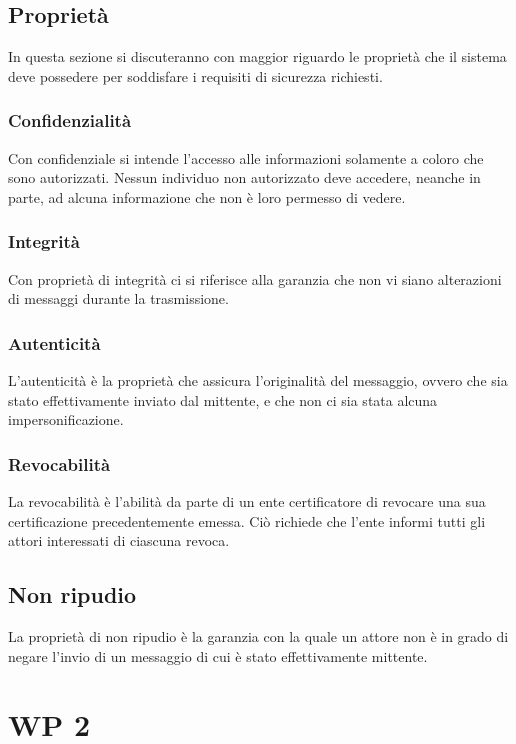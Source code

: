 \documentclass[a4paper,12pt]{article}
\begin{document}
\subsection{Proprietà}
In questa sezione si discuteranno con maggior riguardo le proprietà che il sistema deve possedere per soddisfare i requisiti di sicurezza richiesti.
\subsubsection{Confidenzialità}
Con confidenziale si intende l'accesso alle informazioni solamente a coloro che sono autorizzati. Nessun individuo non autorizzato deve accedere, neanche in parte, ad alcuna informazione che non è loro permesso di vedere.
\subsubsection{Integrità}
Con proprietà di integrità ci si riferisce alla garanzia che non vi siano alterazioni di messaggi durante la trasmissione. 
\subsubsection{Autenticità}
L'autenticità è la proprietà che assicura l'originalità del messaggio, ovvero che sia stato effettivamente inviato dal mittente, e che non ci sia stata alcuna impersonificazione.
\subsubsection{Revocabilità}
La revocabilità è l'abilità da parte di un ente certificatore di revocare una sua certificazione precedentemente emessa. Ciò richiede che l'ente informi tutti gli attori interessati di ciascuna revoca.
\subsection{Non ripudio}
La proprietà di non ripudio è la garanzia con la quale un attore non è in grado di negare l'invio di un messaggio di cui è stato effettivamente mittente. 
\newpage
\section{WP 2}
\end{document}
